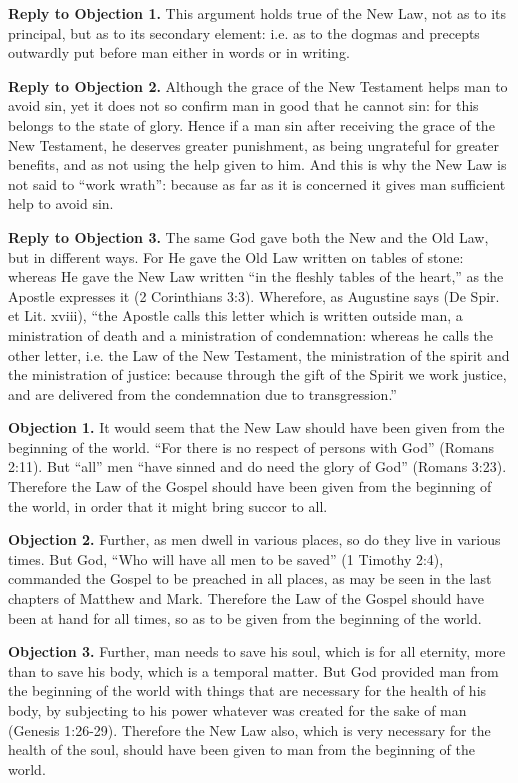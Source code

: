 \textbf{Reply to Objection 1.} This argument holds true of the New Law, not as to its principal, but as to its secondary element: i.e. as to the dogmas and precepts outwardly put before man either in words or in writing.

\textbf{Reply to Objection 2.} Although the grace of the New Testament helps man to avoid sin, yet it does not so confirm man in good that he cannot sin: for this belongs to the state of glory. Hence if a man sin after receiving the grace of the New Testament, he deserves greater punishment, as being ungrateful for greater benefits, and as not using the help given to him. And this is why the New Law is not said to ``work wrath'': because as far as it is concerned it gives man sufficient help to avoid sin.

\textbf{Reply to Objection 3.} The same God gave both the New and the Old Law, but in different ways. For He gave the Old Law written on tables of stone: whereas He gave the New Law written ``in the fleshly tables of the heart,'' as the Apostle expresses it (2 Corinthians 3:3). Wherefore, as Augustine says (De Spir. et Lit. xviii), ``the Apostle calls this letter which is written outside man, a ministration of death and a ministration of condemnation: whereas he calls the other letter, i.e. the Law of the New Testament, the ministration of the spirit and the ministration of justice: because through the gift of the Spirit we work justice, and are delivered from the condemnation due to transgression.''


\textbf{Objection 1.} It would seem that the New Law should have been given from the beginning of the world. ``For there is no respect of persons with God'' (Romans 2:11). But ``all'' men ``have sinned and do need the glory of God'' (Romans 3:23). Therefore the Law of the Gospel should have been given from the beginning of the world, in order that it might bring succor to all.

\textbf{Objection 2.} Further, as men dwell in various places, so do they live in various times. But God, ``Who will have all men to be saved'' (1 Timothy 2:4), commanded the Gospel to be preached in all places, as may be seen in the last chapters of Matthew and Mark. Therefore the Law of the Gospel should have been at hand for all times, so as to be given from the beginning of the world.

\textbf{Objection 3.} Further, man needs to save his soul, which is for all eternity, more than to save his body, which is a temporal matter. But God provided man from the beginning of the world with things that are necessary for the health of his body, by subjecting to his power whatever was created for the sake of man (Genesis 1:26-29). Therefore the New Law also, which is very necessary for the health of the soul, should have been given to man from the beginning of the world.

